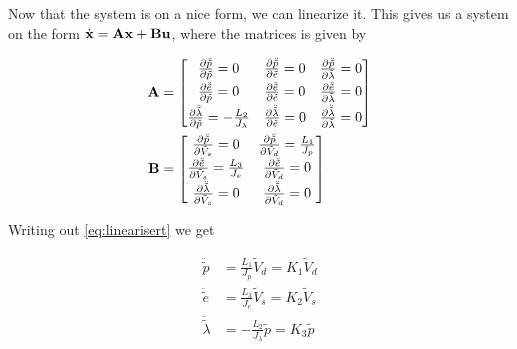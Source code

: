 Now that the system is on a nice form, we can linearize it. This gives us a system on the form $ \dot{\mathbf{x}} = \mathbf{A} \mathbf{x} + \mathbf{B} \mathbf{u} $, where the matrices is given by
	
\begin{subequations}
	\begin{align}
		\mathbf{A} &= \begin{bmatrix}
			\frac{\partial{\ddot{\tilde{p}}}}{\partial{\tilde p}} = 0 & \frac{\partial{\ddot{\tilde p}}}{\partial{\tilde e}} = 0 & \frac{\partial{\ddot{\tilde p}}}{\partial{\tilde \lambda}} = 0\\[0.3em]
			\frac{\partial{\ddot{\tilde{e}}}}{\partial{\tilde p}} = 0 & \frac{\partial{\ddot{\tilde{e}}}}{\partial{\tilde e}} = 0 & \frac{\partial{\ddot{\tilde{e}}}}{\partial{\tilde \lambda}} = 0\\[0.3em]
			\frac{\partial{\ddot{\tilde \lambda}}}{\partial{\tilde p}} = -\frac{L_2}{J_{\lambda}} & \frac{\partial{\ddot{\tilde \lambda}}}{\partial{\tilde e}} = 0 & \frac{\partial{\ddot{\tilde \lambda}}}{\partial{\tilde \lambda}} = 0
		\end{bmatrix} \\
		\mathbf{B} &= \begin{bmatrix}
			\frac{\partial{\ddot{\tilde p}}}{\partial{\tilde V_s}} = 0 & \frac{\partial{\ddot{\tilde p}}}{\partial{\tilde V_d}} = \frac{L_1}{J_p}\\[0.3em]
			\frac{\partial{\ddot{\tilde e}}}{\partial{\tilde V_s}} = \frac{L_3}{J_e} & \frac{\partial{\ddot{\tilde e}}}{\partial{\tilde V_d}} = 0\\[0.3em]
			\frac{\partial{\ddot{\tilde \lambda}}}{\partial{\tilde V_s}} = 0 & \frac{\partial{\ddot{\tilde \lambda}}}{\partial{\tilde V_d}} = 0
		\end{bmatrix}
	\end{align}
	\label{eq:linearisert}
\end{subequations}

Writing out \cref{eq:linearisert} we get

\begin{subequations}
	\begin{align}
		\ddot{\tilde p} &= \frac{L_1}{J_p} \tilde V_d = K_1 \tilde V_d\\
		\ddot{\tilde e} &= \frac{L_3}{J_e} \tilde V_s = K_2 \tilde V_s\\
		\ddot{\tilde \lambda} &= -\frac{L_2}{J_{\lambda}} \tilde p = K_3 \tilde p
	\end{align}
\end{subequations}

